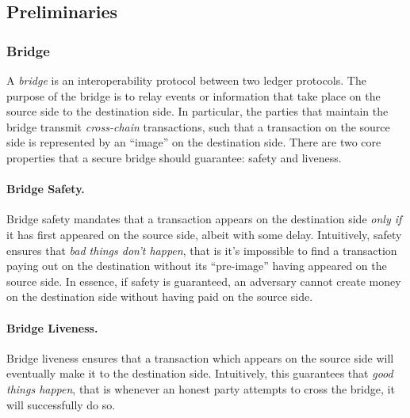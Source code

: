 \subsection{Preliminaries}

\subsubsection{Bridge}
A \emph{bridge} is an interoperability protocol between two ledger protocols.
The purpose of the bridge is to relay events or information that take place on
the source side to the destination side. In particular, the parties that
maintain the bridge transmit \emph{cross-chain} transactions, such that a
transaction on the source side is represented by an ``image'' on the
destination side. There are two core properties that a secure bridge should 
guarantee: safety and liveness.

\paragraph{Bridge Safety.}
Bridge safety mandates that a transaction appears on the destination side \emph{only if} it has first
appeared on the source side, albeit with some delay.
%
Intuitively, safety ensures that \emph{bad
things don't happen}, that is it's impossible to find a transaction paying out on the
destination without its ``pre-image'' having appeared on the source side. 
In essence, if safety is guaranteed, an adversary cannot create money on the
destination side without having paid on the source side.
%

\paragraph{Bridge Liveness.}
Bridge liveness ensures that a transaction which appears on the source side will eventually make
it to the destination side. Intuitively, this guarantees that \emph{good things happen}, that is whenever an
honest party attempts to cross the bridge, it will successfully do so.

